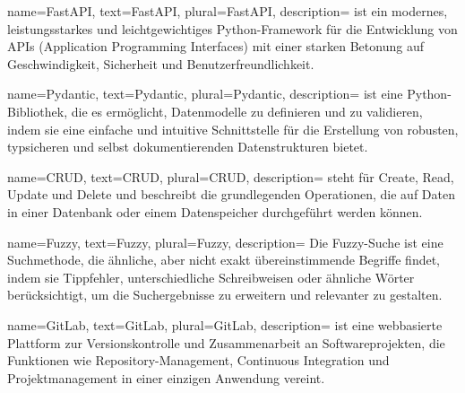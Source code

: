 {
  name={FastAPI}, %
  text={FastAPI}, %
  plural={FastAPI}, %
  description=
    {
        ist ein modernes, leistungsstarkes und leichtgewichtiges Python-Framework für die Entwicklung von APIs (Application Programming Interfaces) mit einer starken Betonung auf Geschwindigkeit, Sicherheit und Benutzerfreundlichkeit.
    }
}

{
  name={Pydantic}, %
  text={Pydantic}, %
  plural={Pydantic}, %
  description=
    {
        ist eine Python-Bibliothek, die es ermöglicht, Datenmodelle zu definieren und zu validieren, indem sie eine einfache und intuitive Schnittstelle für die Erstellung von robusten, typsicheren und selbst dokumentierenden Datenstrukturen bietet.
    }
}

{
  name={CRUD}, %
  text={CRUD}, %
  plural={CRUD}, %
  description=
    {
        steht für Create, Read, Update und Delete und beschreibt die grundlegenden Operationen, die auf Daten in einer Datenbank oder einem Datenspeicher durchgeführt werden können.
    }
}

{
  name={Fuzzy}, %
  text={Fuzzy}, %
  plural={Fuzzy}, %
  description=
    {
      Die Fuzzy-Suche ist eine Suchmethode, die ähnliche, aber nicht exakt übereinstimmende Begriffe findet, indem sie Tippfehler, unterschiedliche Schreibweisen oder ähnliche Wörter berücksichtigt, um die Suchergebnisse zu erweitern und relevanter zu gestalten.
    }
}

{
  name={GitLab}, %
  text={GitLab}, %
  plural={GitLab}, %
  description=
    {
      ist eine webbasierte Plattform zur Versionskontrolle und Zusammenarbeit an Softwareprojekten, die Funktionen wie Repository-Management, Continuous Integration und Projektmanagement in einer einzigen Anwendung vereint.
    }
}

%

